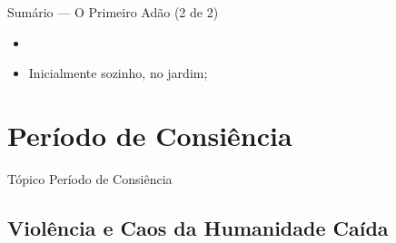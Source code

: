 \documentclass[12pt,aspectratio=169]{beamer}
\newcommand{\ORA}[1]{{\textcolor{TXred!50!TXyel}{#1}}}
\begin{document}
    \begin{frame}
        \par\noindent\hspace*{0.05\linewidth}%
        \begin{minipage}{0.9\linewidth}%
            \large%
            \begin{alertblock}{Sumário --- O Primeiro Adão (2 de 2)}
                \normalsize
                \begin{itemize}
                    \item<1-> 
                    \item<1-> Inicialmente \ORA{sozinho}, no \ORA{jardim};
                \end{itemize}
            \end{alertblock}
        \end{minipage}%
    \end{frame}

\section{Período de Consiência}

    \begin{frame}
        \par\noindent\hspace*{0.05\linewidth}%
        \begin{minipage}{0.9\linewidth}%
            \large%
            \begin{alertblock}{Tópico}
                Período de Consiência
            \end{alertblock}
        \end{minipage}%
    \end{frame}

    \subsection{Violência e Caos da Humanidade Caída}
\end{document}
